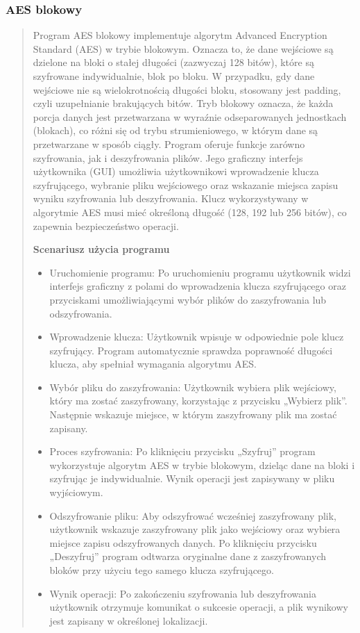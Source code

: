 \documentclass[12pt,a4paper]{article}
\begin{document}
\subsubsection{AES blokowy}
\begin{quotation} \noindent Program AES blokowy implementuje algorytm Advanced Encryption Standard (AES) w trybie blokowym. Oznacza to, że dane wejściowe są dzielone na bloki o stałej długości (zazwyczaj 128 bitów), które są szyfrowane indywidualnie, blok po bloku. W przypadku, gdy dane wejściowe nie są wielokrotnością długości bloku, stosowany jest padding, czyli uzupełnianie brakujących bitów. Tryb blokowy oznacza, że każda porcja danych jest przetwarzana w wyraźnie odseparowanych jednostkach (blokach), co różni się od trybu strumieniowego, w którym dane są przetwarzane w sposób ciągły. Program oferuje funkcje zarówno szyfrowania, jak i deszyfrowania plików. Jego graficzny interfejs użytkownika (GUI) umożliwia użytkownikowi wprowadzenie klucza szyfrującego, wybranie pliku wejściowego oraz wskazanie miejsca zapisu wyniku szyfrowania lub deszyfrowania. Klucz wykorzystywany w algorytmie AES musi mieć określoną długość (128, 192 lub 256 bitów), co zapewnia bezpieczeństwo operacji.\newline

\noindent\textbf{Scenariusz użycia programu}
\begin{itemize}
\item Uruchomienie programu: Po uruchomieniu programu użytkownik widzi interfejs graficzny z polami do wprowadzenia klucza szyfrującego oraz przyciskami umożliwiającymi wybór plików do zaszyfrowania lub odszyfrowania.
\item Wprowadzenie klucza: Użytkownik wpisuje w odpowiednie pole klucz szyfrujący. Program automatycznie sprawdza poprawność długości klucza, aby spełniał wymagania algorytmu AES.
\item Wybór pliku do zaszyfrowania: Użytkownik wybiera plik wejściowy, który ma zostać zaszyfrowany, korzystając z przycisku „Wybierz plik”. Następnie wskazuje miejsce, w którym zaszyfrowany plik ma zostać zapisany.
\item Proces szyfrowania: Po kliknięciu przycisku „Szyfruj” program wykorzystuje algorytm AES w trybie blokowym, dzieląc dane na bloki i szyfrując je indywidualnie. Wynik operacji jest zapisywany w pliku wyjściowym.
\item Odszyfrowanie pliku: Aby odszyfrować wcześniej zaszyfrowany plik, użytkownik wskazuje zaszyfrowany plik jako wejściowy oraz wybiera miejsce zapisu odszyfrowanych danych. Po kliknięciu przycisku „Deszyfruj” program odtwarza oryginalne dane z zaszyfrowanych bloków przy użyciu tego samego klucza szyfrującego.
\item Wynik operacji: Po zakończeniu szyfrowania lub deszyfrowania użytkownik otrzymuje komunikat o sukcesie operacji, a plik wynikowy jest zapisany w określonej lokalizacji.
\end{itemize}
\end{quotation}
\end{document}
